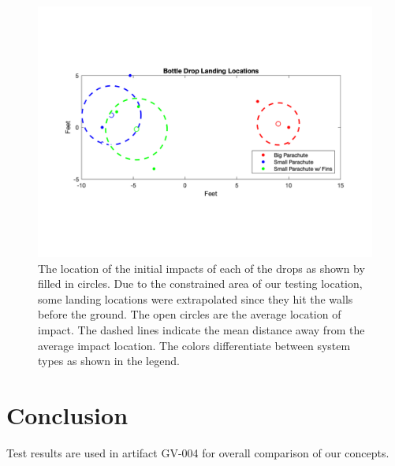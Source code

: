 \documentclass[]{auvsi_doc}
\begin{document}
\begin{figure}[h]
\includegraphics[width=\columnwidth]{LandingLocations.png}
\caption{The location of the initial impacts of each of the drops as shown by filled in circles. Due to the constrained area of our testing location, some landing locations were extrapolated since they hit the walls before the ground. The open circles are the average location of impact. The dashed lines indicate the mean distance away from the average impact location. The colors differentiate between system types as shown in the legend.}
\label{fig:locations}
\end{figure}

\section{Conclusion}
Test results are used in artifact GV-004 for overall comparison of our concepts.
\end{document}
